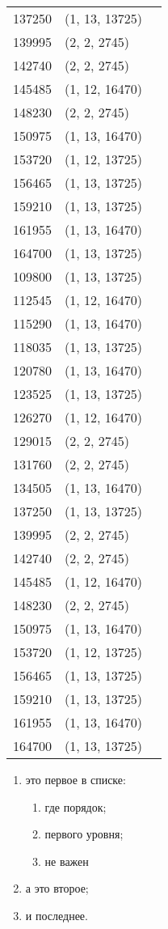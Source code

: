 \begin{longtable}{|l|l|l|}
		137250 & (1, 13, 13725)\\
		139995 & (2, 2, 2745)  \\
		142740 & (2, 2, 2745)  \\
		145485 & (1, 12, 16470) \\
		148230 & (2, 2, 2745)  \\
		150975 & (1, 13, 16470)  \\
		153720 & (1, 12, 13725) \\
		156465 & (1, 13, 13725)  \\
		159210 & (1, 13, 13725)  \\
		161955 & (1, 13, 16470)  \\
		164700 & (1, 13, 13725) \\
		109800 & (1, 13, 13725) \\
		112545 & (1, 12, 16470)  \\
		115290 & (1, 13, 16470) \\
		118035 & (1, 13, 13725) \\
		120780 & (1, 13, 16470) \\
		123525 & (1, 13, 13725) \\
		126270 & (1, 12, 16470) \\
		129015 & (2, 2, 2745) \\
		131760 & (2, 2, 2745)  \\
		134505 & (1, 13, 16470) \\
		137250 & (1, 13, 13725)\\
		139995 & (2, 2, 2745)  \\
		142740 & (2, 2, 2745)  \\
		145485 & (1, 12, 16470) \\
		148230 & (2, 2, 2745)  \\
		150975 & (1, 13, 16470)  \\
		153720 & (1, 12, 13725) \\
		156465 & (1, 13, 13725)  \\
		159210 & (1, 13, 13725)  \\
		161955 & (1, 13, 16470)  \\
		164700 & (1, 13, 13725) \\
	\end{longtable}

\begin{enumerate}
	\gostEnum
	\item это первое в списке:
		\begin{enumerate}
			\gostEnum
			\item где порядок;
			\item первого уровня;
			\item не важен
		\end{enumerate}
	\item а это второе;
	\item и последнее.
\end{enumerate}

